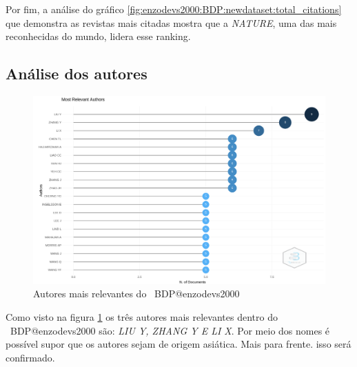 Por fim, a análise do gráfico \ref{fig:enzodevs2000:BDP:newdataset:total_citations} que demonstra as revistas mais citadas mostra que a \textit{NATURE}, uma das mais reconhecidas do mundo, lidera esse ranking.

\subsection{Análise dos autores}

\begin{figure}[H]
    \centering
    \includegraphics[width=1\textwidth]{experiments/enzodevs2000/AnaliseBibliometrica/BigDataInPolicy/Figures/Graficos/NovoDataset/Authors/mstrlvAuthors.png}
    \caption{Autores mais relevantes do
    \dataset\ BDP@enzodevs2000}
    \label{fig:enzodevs2000:BDP:newdataset:authors:most_relevance}
\end{figure}

Como visto na figura \ref{fig:enzodevs2000:BDP:newdataset:authors:most_relevance} os três autores mais relevantes dentro do \dataset\ BDP@enzodevs2000 são: \textit{LIU Y, ZHANG Y E LI X}. Por meio dos nomes é possível supor que os autores sejam de origem asiática. Mais para frente. isso será confirmado.

